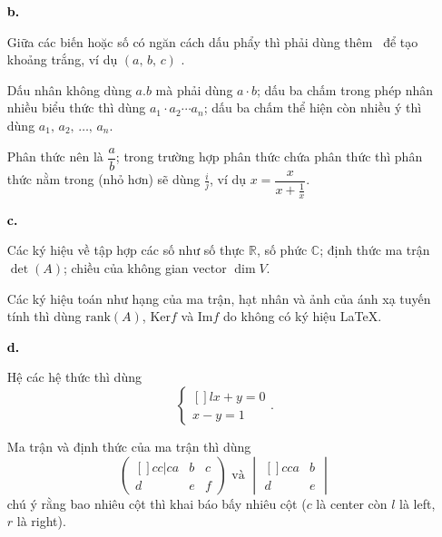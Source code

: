 \begin{itemize}
{        %
      }

      \item[\textcolor{black}{\textbf{b.}}] {
        Giữa các biến hoặc số có ngăn cách dấu phẩy thì phải dùng thêm $\,$ để tạo khoảng trắng, ví dụ $(a,\,b,\,c)$ .

        Dấu nhân không dùng $a . b$ mà phải dùng $a \cdot b$; dấu ba chấm trong phép nhân nhiều biểu thức thì dùng $a_1 \cdot a_2 \cdots a_n$; dấu ba chấm thể hiện còn nhiều ý thì dùng $a_1,\,a_2,\,\ldots,\,a_n$.

        Phân thức nên là $\dfrac{a}{b}$; trong trường hợp phân thức chứa phân thức thì phân thức nằm trong (nhỏ hơn) sẽ dùng $\frac{i}{j}$, ví dụ $x = \dfrac{x}{x + \frac{1}{x}}$.

      }

      \item[\textcolor{black}{\textbf{c.}}] {
        Các ký hiệu về tập hợp các số như số thực $\mathbb{R}$, số phức $\mathbb{C}$; định thức ma trận $\det(A)$; chiều của không gian vector $\dim V$. 

        Các ký hiệu toán như hạng của ma trận, hạt nhân và ảnh của ánh xạ tuyến tính thì dùng $\text{rank}(A)$, $\text{Ker}f$ và $\text{Im}f$ do không có ký hiệu \LaTeX.

      }

      \item[\textcolor{black}{\textbf{d.}}] {
        Hệ các hệ thức thì dùng 
        $$\left\{ \begin{matrix}[]{l}
            x + y = 0 \\ 
            x - y = 1
        \end{matrix} \right..$$

        Ma trận và định thức của ma trận thì dùng 
        $$\begin{pmatrix}[]{cc|c}
            a & b & c \\ 
            d & e & f
        \end{pmatrix} \text{ và } \begin{vmatrix}[]{cc}
          a & b \\ 
          d & e
        \end{vmatrix}$$
        chú ý rằng bao nhiêu cột thì khai báo bấy nhiêu cột ($c$ là center còn $l$ là left, $r$ là right).

}
\end{itemize}
